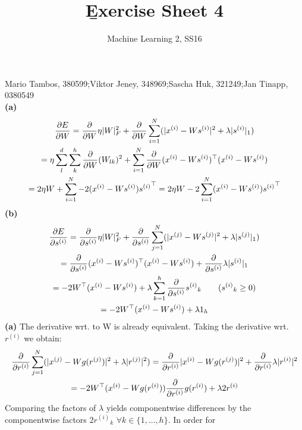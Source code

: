 \documentclass[a4paper]{article}
\newcommand{\rhi}{{r^{(i)}}}
\newcommand{\rhj}{{r^{(j)}}}
\newcommand{\xhi}{{x^{(i)}}}
\newcommand{\shi}{{s^{(i)}}}
\newcommand{\xhj}{{x^{(j)}}}
\newcommand{\shj}{{s^{(j)}}}
\newcommand{\Wlk}{W_{lk}}
\newcommand{\1}{\mathds{1}}
\begin{document}
\title{\b{Exercise Sheet 4}}
\author{Machine Learning 2, SS16}

\maketitle

Mario Tambos, 380599;\quad Viktor Jeney, 348969;\quad Sascha Huk, 321249;\quad Jan Tinapp, 0380549\\


\textbf{(a)}
\begin{gather*}
	{\partial E\over\partial W}
	=
	{\partial\over\partial W}\eta |W|_F^2
	+
	{\partial\over\partial W} \sum_{i=1}^N (|\xhi - W\shi|^2 +	\lambda |\shi|_1)
	\\
	= 
	\eta\sum_{l}^{d}\sum_{k}^{h}{\partial\over\partial W} (\Wlk)^2
	+ 
	\sum_{i=1}^N
		{\partial\over\partial W}(\xhi - W\shi)^\top (\xhi - W\shi)
	\\
	=
	2\eta W
	+ 
	\sum_{i=1}^N
		-2(\xhi - W\shi)\shi^\top
	=
	2\eta W
	- 
	2\sum_{i=1}^N
		(\xhi - W\shi)\shi^\top			
\end{gather*} 
\textbf{(b)}
\begin{gather*}
	{\partial E\over\partial \shi}
	=
	{\partial\over\partial \shi}\eta |W|_F^2
	+
	{\partial\over\partial \shi} \sum_{j=1}^N (|\xhj - W\shj|^2 +	\lambda |\shj|_1)
	\\
	=
	{\partial\over\partial \shi} (\xhi - W\shi)^\top (\xhi - W\shi) 
	              +	{\partial\over\partial \shi} \lambda |\shi|_1
	\\
	=
	-2 W^\top(\xhi-W\shi) 
	              +	\lambda \sum_{k=1}^h {\partial\over\partial \shi}\shi_k 
	              \quad\quad\text{($\shi_k\geq 0$)}
	\\
	=
	-2 W^\top(\xhi-W\shi) 
	+	\lambda 1_h	
\end{gather*} 
\textbf{(a)}
The derivative wrt. to W is already equivalent. 
Taking the derivative wrt. $\rhi$ we obtain:
\begin{gather*}
	{\partial\over\partial \rhi}\sum_{j=1}^N 
	(|\xhj - Wg(\rhj)|^2 +	\lambda |\rhj|^2)
	=
	{\partial\over\partial \rhi} |\xhi - Wg(\rhj)|^2 
	+ {\partial\over\partial \rhi} \lambda |\rhi|^2
	\\
	= -2 W^\top(\xhi-Wg(\rhi)){\partial\over\partial \rhi}g(\rhi) 
	+	\lambda 2\rhi	 
\end{gather*}
Comparing the factors of $\lambda$ yields componentwise 
differences by the componentwise factors $2\rhi_k$ $\forall k\in\{1,\ldots,h\}$. In order for 
\end{document}
